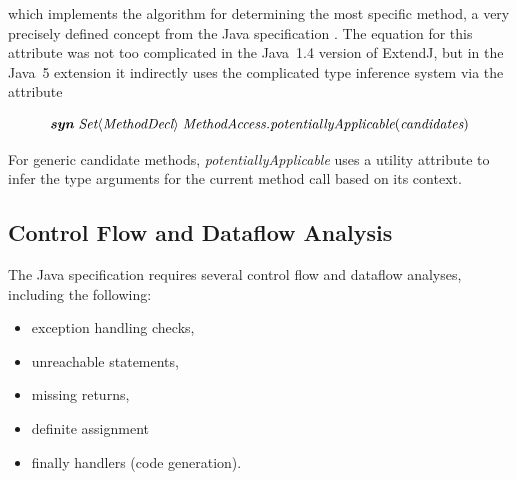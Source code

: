 \documentclass[10pt, twoside, openright]{book}
\begin{document}
\noindent
which implements the algorithm for determining the most specific method, a very precisely
defined concept from the Java specification \cite[\S 15.12.2.5]{jls7}.
The equation for this attribute was not too complicated in the Java~1.4 version of ExtendJ,
but in the Java~5 extension it indirectly uses the complicated type inference system
via the attribute

\begin{equation*}
\textbf{\textit{syn}} \; \textit{Set}\langle\textit{MethodDecl}\rangle \; \textit{MethodAccess.potentiallyApplicable}(\textit{candidates})
\end{equation*}

\noindent
For generic candidate methods, \emph{potentiallyApplicable} uses a utility attribute to infer
the type arguments for the current method call based on its context.

%


\subsection{Control Flow and Dataflow Analysis}

The Java specification requires several control flow and dataflow analyses,
including the following:

\begin{itemize}
  \item exception handling checks,
  \item unreachable statements,
  \item missing returns,
  \item definite assignment
  \item finally handlers (code generation).
\end{itemize}
\end{document}
